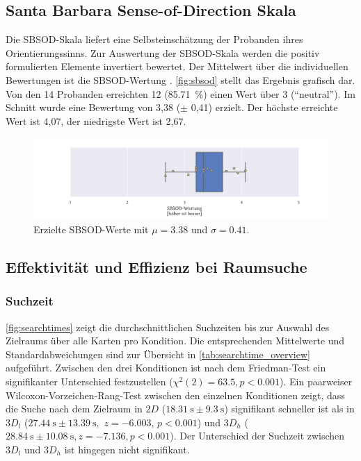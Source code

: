 \subsection{Santa Barbara Sense-of-Direction Skala}
Die SBSOD-Skala liefert eine Selbsteinschätzung der Probanden ihres Orientierungssinns.
Zur Auswertung der SBSOD-Skala werden die positiv formulierten Elemente invertiert bewertet.
Der Mittelwert über die individuellen Bewertungen ist die SBSOD-Wertung \parencite{Hegarty2002}.
\autoref{fig:sbsod} stellt das Ergebnis grafisch dar.
Von den 14 Probanden erreichten 12 (\SI{85,71}{\percent}) einen Wert über 3 (\enquote{neutral}).
Im Schnitt wurde eine Bewertung von 3,38 ($\pm$ 0,41) erzielt.
Der höchste erreichte Wert ist 4,07, der niedrigste Wert ist 2,67.
\begin{figure}[h!]
    \centering
    \includegraphics[trim={3cm, 0, 2.5cm, 0}, clip, width=\linewidth]{figures/analysis/sbsod}
    \caption{Erzielte SBSOD-Werte mit $\mu = \num{3,38}$ und $\sigma = \num{0,41}$.}
    \label{fig:sbsod}
\end{figure}

\subsection{Effektivität und Effizienz bei Raumsuche}
\subsubsection*{Suchzeit}
\label{ssec:searchtime}

\autoref{fig:searchtimes} zeigt die durchschnittlichen Suchzeiten bis zur Auswahl des Zielraums über alle Karten pro Kondition.
Die entsprechenden Mittelwerte und Standardabweichungen sind zur Übersicht in \autoref{tab:searchtime_overview} aufgeführt.
Zwischen den drei Konditionen ist nach dem Friedman-Test ein signifikanter Unterschied festzustellen ($\chi^2(2) = \num{63.5}, p < 0.001$).
Ein paarweiser Wilcoxon-Vorzeichen-Rang-Test zwischen den einzelnen Konditionen zeigt, dass die Suche nach dem Zielraum in $2D$ ($\SI{18.31}{\second} \pm \SI{9.3}{\second}$) signifikant schneller ist als in $3D_l$ \mbox{($\SI{27.44}{\second} \pm \SI{13.39}{\second},$} \mbox{$z=\num{-6.003}$}, \mbox{$p<\num{0.001}$)} und $3D_h$ ($\SI{28.84}{\second} \pm \SI{10.08}{\second}, z=\num{-7.136}, p<0.001$).
Der Unterschied der Suchzeit zwischen $3D_l$ und $3D_h$ ist hingegen nicht signifikant.

